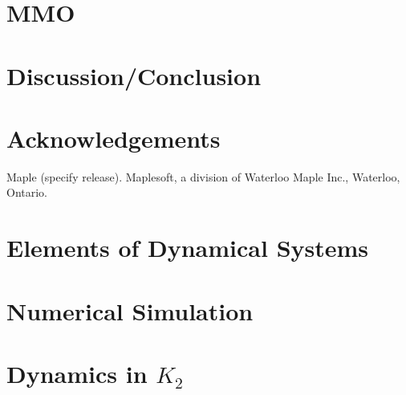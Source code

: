 \documentclass{article}
\begin{document}
\section{MMO}\label{sec:MMO}


\section{Discussion/Conclusion}

\section{Acknowledgements}
Maple (specify release). Maplesoft, a division of Waterloo Maple Inc., Waterloo, Ontario.
\newpage


\nocite{strogatz2007nonlinear}

\newpage
\appendix
\section{Elements of Dynamical Systems}\label{app:DynSys}

%
%
\section{Numerical Simulation}\label{app:NumSim}

\section{Dynamics in \texorpdfstring{$K_2$}{K2}}
\end{document}
